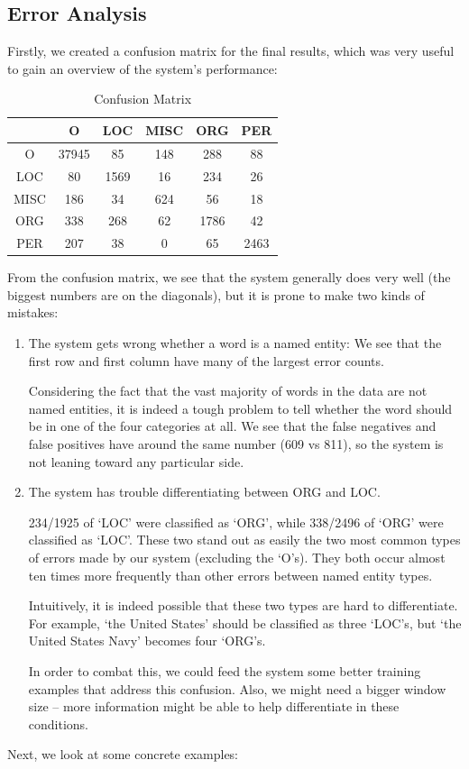 \documentclass[12pt, twocolumn]{article}
\begin{document}
\subsection{Error Analysis}
Firstly, we created a confusion matrix for the final results, which was very useful to gain an overview of the system's performance:
\begin{table}[H]
\centering
\begin{tabular}{|c|c|c|c|c|c|}
		\hline
		 & O & LOC & MISC & ORG & PER \\\hline
		O & 37945 & 85 & 148 & 288 & 88 \\\hline
		LOC & 80 & 1569 & 16 & 234 & 26 \\\hline
		MISC & 186 & 34 & 624 & 56 & 18 \\\hline
		ORG & 338 & 268 & 62 & 1786 & 42 \\\hline
		PER & 207 & 38 & 0 & 65 & 2463 \\\hline
	\end{tabular}
	\caption{Confusion Matrix}
\label{tab:confusion}
\end{table}
From the confusion matrix, we see that the system generally does very well (the biggest numbers are on the diagonals), but it is prone to make two kinds of mistakes:
\begin{enumerate}
\item
The system gets wrong whether a word is a named entity: We see that the first row and first column have many of the largest error counts.

Considering the fact that the vast majority of words in the data are not named entities, it is indeed a tough problem to tell whether the word should be in one of the four categories at all. We see that the false negatives and false positives have around the same number (609 vs 811), so the system is not leaning toward any particular side.
\item
The system has trouble differentiating between ORG and LOC.

234/1925 of `LOC' were classified as `ORG', while 338/2496 of `ORG' were classified as `LOC'. These two stand out as easily the two most common types of errors made by our system (excluding the `O's). They both occur almost ten times more frequently than other errors between named entity types.

Intuitively, it is indeed possible that these two types are hard to differentiate. For example, `the United States' should be classified as three `LOC's, but `the United States Navy' becomes four `ORG's.

In order to combat this, we could feed the system some better training examples that address this confusion. Also, we might need a bigger window size -- more information might be able to help differentiate in these conditions.
\end{enumerate}
Next, we look at some concrete examples:
\end{document}
